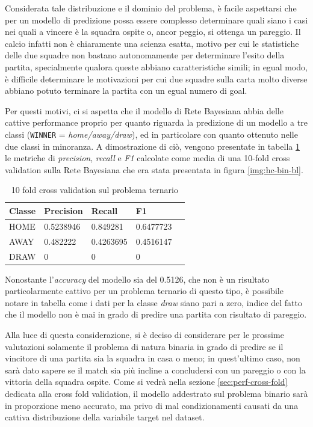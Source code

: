 \documentclass[hidelinks, 12pt]{article}
\begin{document}
Considerata tale distribuzione e il dominio del problema, è facile aspettarsi che per un modello di predizione possa essere complesso determinare quali siano i casi nei quali a vincere è la squadra ospite o, ancor peggio, si ottenga un pareggio. Il calcio infatti non è chiaramente una scienza esatta, motivo per cui le statistiche delle due squadre non bastano autonomamente per determinare l'esito della partita, specialmente qualora queste abbiano caratteristiche simili; in egual modo, è difficile determinare le motivazioni per cui due squadre sulla carta molto diverse abbiano potuto terminare la partita con un egual numero di goal.

Per questi motivi, ci si aspetta che il modello di Rete Bayesiana abbia delle cattive performance proprio per quanto riguarda la predizione di un modello a tre classi (\texttt{WINNER} = \textit{home/away/draw}), ed in particolare con quanto ottenuto nelle due classi in minoranza. A dimostrazione di ciò, vengono presentate in tabella \ref{tab:10-fold-tern} le metriche di \textit{precision}, \textit{recall} e \textit{F1} calcolate come media di una 10-fold cross validation sulla Rete Bayesiana che era stata presentata in figura \ref{img:hc-bin-bl}.

\begin{table}[H]
	\centering
	\caption{10 fold cross validation sul problema ternario}
	\begin{tabular}{l|llll}
		\hline
		Classe & Precision & Recall & F1 \\
		\hline
		HOME & 0.5238946 & 0.849281 & 0.6477723 \\
		AWAY & 0.482222 & 0.4263695 & 0.4516147 \\
		DRAW & 0 & 0 & 0 \\
		\hline
	\end{tabular}
	\label{tab:10-fold-tern}
\end{table}

Nonostante l'\textit{accuracy} del modello sia del 0.5126, che non è un risultato particolarmente cattivo per un problema ternario di questo tipo, è possibile notare in tabella come i dati per la classe \textit{draw} siano pari a zero, indice del fatto che il modello non è mai in grado di predire una partita con risultato di pareggio.

\vspace{4ex}

Alla luce di questa considerazione, si è deciso di considerare per le prossime valutazioni solamente il problema di natura binaria in grado di predire se il vincitore di una partita sia la squadra in casa o meno; in quest'ultimo caso, non sarà dato sapere se il match sia più incline a concludersi con un pareggio o con la vittoria della squadra ospite. Come si vedrà nella sezione \ref{sec:perf-cross-fold} dedicata alla cross fold validation, il modello addestrato sul problema binario sarà in proporzione meno accurato, ma privo di mal condizionamenti causati da una cattiva distribuzione della variabile target nel dataset.
\end{document}
